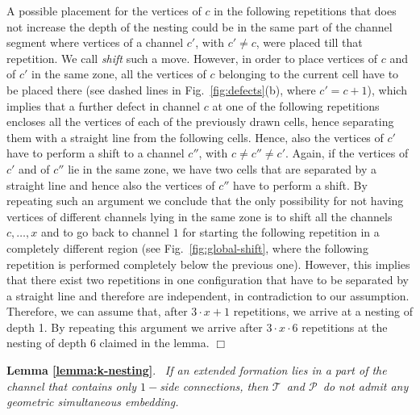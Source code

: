 \documentclass[a4paper,10pt]{llncs}
\renewenvironment{proof}
{{\bf Proof:}}{\hspace*{\fill}$\Box$\par\vspace{2mm}}
\newcommand{\rephrase}[3]{\noindent\textbf{#1 #2}.~\emph{#3}}
\newcommand{\T}{\mbox{$\mathcal T$ }}
\renewcommand{\P}{\mbox{$\mathcal P$ }}
\begin{document}
\begin{proof}
A possible placement for the vertices of $c$ in the following repetitions that does not increase the depth of the nesting could be in the same part of the channel segment where vertices of a channel $c'$, with $c' \neq c$, were placed till that repetition. We call \emph{shift} such a move. However, in order to place vertices of $c$ and of $c'$ in the same zone, all the vertices of $c$ belonging to the current cell have to be placed there (see dashed lines in Fig.~\ref{fig:defects}(b), where $c'=c+1$), which implies that a further defect in channel $c$ at one of the following repetitions encloses all the vertices of each of the previously drawn cells, hence separating them with a straight line from the following cells. Hence, also the vertices of $c'$ have to perform a shift to a channel $c''$, with $c \neq c'' \neq c'$. Again, if the vertices of $c'$ and of $c''$ lie in the same zone, we have two cells that are separated by a straight line and hence also the vertices of $c''$ have to perform a shift. By repeating such an argument we conclude that the only possibility for not having vertices of different channels lying in the same zone is to shift all the channels $c,\ldots,x$ and to go back to channel $1$ for starting the following repetition in a completely different region (see Fig.~\ref{fig:global-shift}, where the following repetition is performed completely below the previous one). However, this implies that there exist two repetitions in one configuration that have to be separated by a straight line and therefore are independent, in contradiction to our assumption.
Therefore, we can assume that, after $3\cdot x + 1 $ repetitions, we arrive at a nesting of depth 1. By repeating this argument we arrive after $3\cdot x\cdot 6$ repetitions at the nesting of depth $6$ claimed in the lemma.
\end{proof}

\rephrase{Lemma}{\ref{lemma:k-nesting}}{
If an extended formation lies in a part of the channel that contains only $1-$side connections, then \T and \P do not admit any geometric simultaneous embedding.
}
\end{document}
